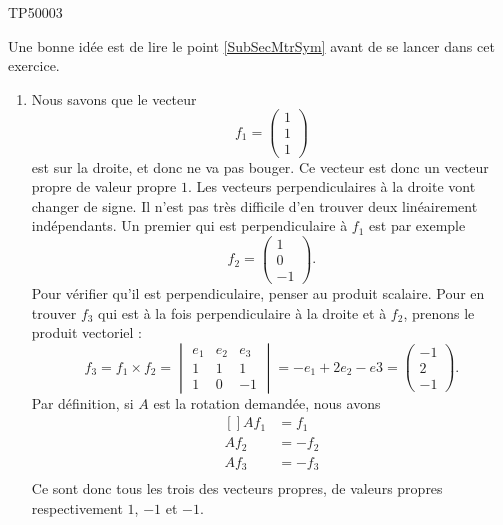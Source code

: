 \begin{corrige}{TP50003}

	Une bonne idée est de lire le point \ref{SubSecMtrSym} avant de se lancer dans cet exercice. 
	\begin{enumerate}

		\item
			Nous savons que le vecteur 
			\begin{equation}
				f_1=\begin{pmatrix}
					1	\\ 
					1	\\ 
					1	
				\end{pmatrix}
			\end{equation}
			est sur la droite, et donc ne va pas bouger. Ce vecteur est donc un vecteur propre de valeur propre $1$. Les vecteurs perpendiculaires à la droite vont changer de signe. Il n'est pas très difficile d'en trouver deux linéairement indépendants. Un premier qui est perpendiculaire à $f_1$ est par exemple
			\begin{equation}
				f_2=\begin{pmatrix}
					1	\\ 
					0	\\ 
					-1	
				\end{pmatrix}.
			\end{equation}
			Pour vérifier qu'il est perpendiculaire, penser au produit scalaire. Pour en trouver $f_3$ qui est à la fois perpendiculaire à la droite et à $f_2$, prenons le produit vectoriel :
			\begin{equation}
				f_3=f_1\times f_2=\begin{vmatrix}
					e_1	&	e_2	&	e_3	\\
					1	&	1	&	1	\\
					1	&	0	&	-1
				\end{vmatrix}=-e_1+2e_2-e3=\begin{pmatrix}
					-1	\\ 
					2	\\ 
					-1	
				\end{pmatrix}.
			\end{equation}
			Par définition, si $A$ est la rotation demandée, nous avons
			\begin{equation}
				\begin{aligned}[]
					Af_1&=f_1\\
					Af_2&=-f_2\\
					Af_3&=-f_3\\
				\end{aligned}
			\end{equation}
			Ce sont donc tous les trois des vecteurs propres, de valeurs propres respectivement $1$, $-1$ et $-1$.


\end{enumerate}
\end{corrige}
